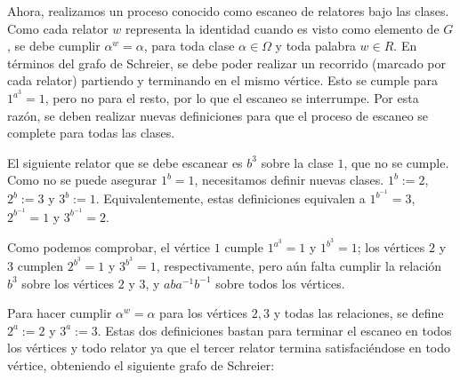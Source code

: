 Ahora, realizamos un proceso conocido como escaneo de relatores bajo las clases. Como cada relator $w$ representa la identidad cuando es visto como elemento  de $G$, se debe cumplir $\alpha^w = \alpha$, para toda clase $\alpha \in \Omega$ y toda palabra $w \in R$. En términos del grafo de Schreier, se debe poder realizar un recorrido (marcado por cada relator) partiendo y terminando en el mismo vértice.
Esto se cumple para $1^{a^3}=1$, pero no para el resto, por lo que el escaneo se interrumpe. Por esta razón, se deben realizar nuevas definiciones para que el proceso de escaneo se complete para todas las clases.

El siguiente relator que se debe escanear es $b^3$ sobre la clase $1$, que no se cumple. Como no se puede asegurar $1^b=1$, necesitamos definir nuevas clases. $1^b:=2$, $2^b:=3$ y $3^b:=1$.  Equivalentemente, estas definiciones equivalen a $1^{b^{-1}}=3$, $2^{b^{-1}}=1$ y $3^{b^{-1}}=2$. 



\begin{center}
\end{center}


Como podemos comprobar, el vértice $1$ cumple $1^{a^3}=1$ y $1^{b^3}=1$; los vértices $2$ y $3$ cumplen $2^{b^3}=1$ y $3^{b^3}=1$, respectivamente, pero aún falta cumplir la relación $b^3$ sobre los vértices $2$ y $3$, y $aba^{-1}b^{-1}$ sobre todos los vértices. 

Para hacer cumplir $\alpha^{w}=\alpha$ para los vértices $2,3$ y todas las relaciones, se define $2^a:=2$ y $3^a:=3$. Estas dos definiciones bastan para terminar el escaneo en todos los vértices y todo relator ya que el tercer relator termina satisfaciéndose en todo vértice, obteniendo el siguiente grafo de Schreier:

